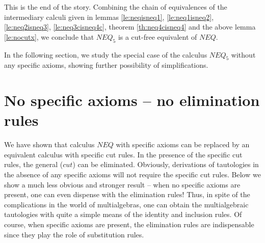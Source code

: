 This is the end of the story. Combining the chain of equivalences of the
intermediary calculi given in lemmas \ref{le:neqisneq1}, \ref{le:neq1isneq2},
\ref{le:neq2isneq3}, \ref{le:neq3cisneq4c}, theorem \ref{th:neq4cisneq4} and
the above lemma \ref{le:nocutx}, we conclude that $NEQ_5$ is a cut-free
equivalent of $NEQ$.

In the following section, we study the special case of the calculus
$NEQ_5$ without any specific axioms, showing further possibility of
simplifications. 

\section{No specific axioms -- no elimination rules}
We have shown that calculus $NEQ$ with specific axioms can be replaced by an
equivalent calculus with specific cut rules.
In the presence of the specific cut rules, the general ($cut$)
can be eliminated. 
Obviously, derivations of tautologies in the absence of any specific axioms
will not require the specific cut rules. Below we show a much less obvious
and stronger result
-- when no specific axioms are present, 
one can even dispense with the elimination rules! Thus, in spite of the
complications in the world of multialgebras, one can
obtain the multialgebraic tautologies with quite a simple means of the identity
and inclusion rules. Of course, when specific axioms are present, the
elimination rules are indispensable since they play the role of substitution rules.

